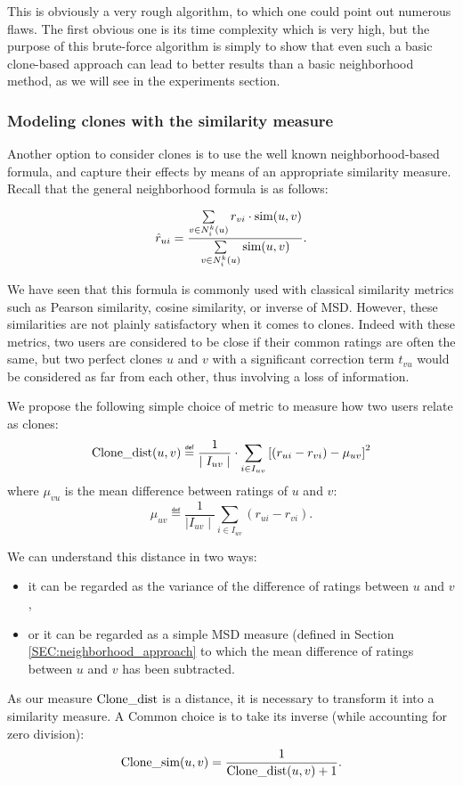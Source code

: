 This is obviously a very rough algorithm, to which one could point out numerous
flaws. The first obvious one is its time complexity which is very high, but the
purpose of this brute-force algorithm is simply to show that even such a basic
clone-based approach can lead to better results than a basic neighborhood
method, as we will see in the experiments section.

\subsubsection{Modeling clones with the similarity measure}
Another option to consider clones is to use the well known neighborhood-based
formula, and capture their effects by means of an appropriate similarity measure.
Recall that the general neighborhood formula is as follows:

$$\hat{r}_{ui} = \frac{\sum\limits_{v \in N_i^k(u)} r_{vi} \cdot \text{sim}(u, v)}
{\sum\limits_{v \in N_i^k(u)}\text{sim}(u, v)}.$$

We have seen that this formula is commonly used with classical similarity
metrics such as Pearson similarity, cosine similarity, or inverse of MSD.
However, these similarities are not plainly satisfactory when it comes to
clones. Indeed with these metrics, two users are considered to be close if
their common ratings are often the same, but two perfect clones $u$ and $v$
with a significant correction term $t_{vu}$ would be considered as far from
each other, thus involving a loss of information.

We propose the following simple choice of metric to measure how two users
relate as clones:
$$\clonedist(u, v) \eqdef  \frac{1}{\mid I_{uv} \mid} \cdot
\sum\limits_{i \in I_{uv}} \left[(r_{ui} - r_{vi}) - \mu_{uv}\right]^2$$
where $\mu_{vu}$ is the mean difference between ratings of $u$ and $v$:
$$\mu_{uv} \eqdef \frac{1}{\mid I_{uv}\mid}\sum_{i \in I_{uv}} (r_{ui} -
r_{vi}).$$

We can understand this distance in two ways:
\begin{itemize}
\item it can be regarded as the variance of the difference of ratings between
  $u$ and $v$,
\item or it can be regarded as a simple MSD measure (defined in Section
  \ref{SEC:neighborhood_approach} to which the mean difference of ratings between $u$ and $v$ has
    been subtracted.
  \end{itemize}

As our measure $\text{Clone\_dist}$ is a distance, it is necessary to transform it into
a similarity measure. A Common choice is to take its inverse (while accounting
for zero division):
$$\text{Clone\_sim}(u, v) = \frac{1}{\text{Clone\_dist}(u, v) + 1}.$$

